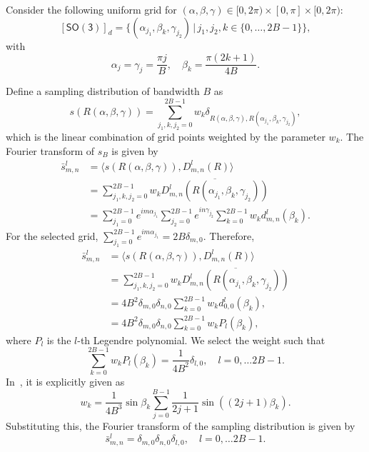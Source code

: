 \documentclass[onecolumn,11pt]{ieeetran}
\newcommand{\pair}[1]{\ensuremath{\langle #1 \rangle}}
\newcommand{\SO}{\ensuremath{\mathsf{SO(3)}}}
\begin{document}
Consider the following uniform grid for $(\alpha,\beta,\gamma)\in[0,2\pi)\times[0,\pi]\times[0,2\pi)$:
\[
[\SO]_d=\{(\alpha_{j_1},\beta_k,\gamma_{j_2})\,|\, j_1,j_2,k\in\{0,\ldots, 2B-1\}\},
\]
with
\begin{equation}\label{eqn:grid}
\alpha_j=\gamma_j= \frac{\pi j}{B},\quad \beta_k = \frac{\pi (2k+1)}{4B}.
\end{equation}

Define a sampling distribution of bandwidth $B$ as
\begin{equation}
s(R(\alpha,\beta,\gamma))=\sum_{j_1,k,j_2=0}^{2B-1} w_k \delta_{R(\alpha,\beta,\gamma),R(\alpha_{j_1},\beta_k,\gamma_{j_2})},
\end{equation}
which is the linear combination of grid points weighted by the parameter $w_k$. The Fourier transform of $s_B$ is given by
\begin{align*}
\bar s^l_{m,n} & = \pair{s(R(\alpha,\beta,\gamma)), D^l_{m,n}(R)}\\
&=\sum_{j_1,k,j_2=0}^{2B-1} w_k \overline{D^l_{m,n}(R(\alpha_{j_1},\beta_k,\gamma_{j_2}))}\\
& = \sum_{j_1=0}^{2B-1} e^{im\alpha_{j_1}}
\sum_{j_2=0}^{2B-1} e^{in\gamma_{j_2}}
\sum_{k=0}^{2B-1} w_k d^l_{m,n}(\beta_k).
\end{align*}
For the selected grid, $\sum_{j_1=0}^{2B-1} e^{im\alpha_{j_1}}=2B \delta_{m,0}$. Therefore,
\begin{align*}
\bar s^l_{m,n} & = \pair{s(R(\alpha,\beta,\gamma)), D^l_{m,n}(R)}\\
&=\sum_{j_1,k,j_2=0}^{2B-1} w_k \overline{D^l_{m,n}(R(\alpha_{j_1},\beta_k,\gamma_{j_2}))}\\
& = 4B^2 \delta_{m,0}\delta_{n,0}\sum_{k=0}^{2B-1} w_k d^l_{0,0}(\beta_k),\\
& = 4B^2 \delta_{m,0}\delta_{n,0}\sum_{k=0}^{2B-1} w_k P_l(\beta_k),
\end{align*}
where $P_l$ is the $l$-th Legendre polynomial. We select the weight such that
\begin{equation}
\sum_{k=0}^{2B-1} w_k P_l(\beta_k) = \frac{1}{4B^2} \delta_{l,0},\quad l=0,\ldots 2B-1.
\end{equation}
In~\cite{DriHeaAAM94}, it is explicitly given as
\begin{equation}
w_k = \frac{1}{4B^3}\sin\beta_k \sum_{j=0}^{B-1} \frac{1}{2j+1}\sin((2j+1)\beta_k).
\end{equation}
Substituting this, the Fourier transform of the sampling distribution is given by
\begin{equation}
\bar s ^l_{m,n}=\delta_{m,0}\delta_{n,0}\delta_{l,0},\quad l=0,\ldots 2B-1.
\label{eqn:bar_s}
\end{equation}
\end{document}
